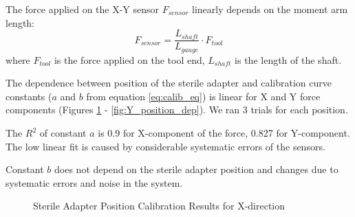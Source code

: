 	The force applied on the X-Y sensor $F_{sensor}$ linearly depends on the moment arm length:
	\begin{equation}
	F_{sensor} = \frac{L_{shaft}}{L_{gauge}} \cdot F_{tool}
	\end{equation}
	where $F_{tool}$ is the force applied on the tool end, $L_{shaft}$ is the length of the shaft.

The dependence between position of the sterile adapter and calibration curve constants ($a$ and $b$ from equation \ref{eq:calib_eq}) is linear for X and Y force components (Figures \ref{fig:X_position_dep} - \ref{fig:Y_position_dep}). We ran 3 trials for each position.

The $R^2$ of constant $a$ is 0.9 for X-component of the force, 0.827 for Y-component. The low linear fit is caused by considerable systematic errors of the sensors.

Constant $b$ does not depend on the sterile adapter position and changes due to systematic errors and noise in the system.

	
\begin{figure}[h]%
\centering
{}%
\qquad
{}%
\caption{Sterile Adapter Position Calibration Results for X-direction}
\label{fig:X_position_dep}%
\end{figure}

